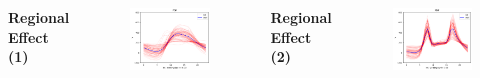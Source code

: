 \documentclass[11pt,compress,t,notes=noshow, aspectratio=169, xcolor=table,dvipsnames]{beamer}
\begin{document}
\begin{frame}
\begin{columns}
      \hspace{2.5cm} %
      \centering
      \textbf{Regional Effect (1)}
        \begin{figure}
          \centering
          \includegraphics[width=.9\linewidth]{slides/03_feature-effects/figure/01_bike_sharing_dataset_28_0.png}
      \end{figure}

     \centering
      \textbf{Regional Effect (2)}
        \begin{figure}
          \centering
          \includegraphics[width=.9\linewidth]{slides/03_feature-effects/figure/01_bike_sharing_dataset_28_1.png}
      \end{figure}     
  \end{columns}
\end{frame}
\end{document}
